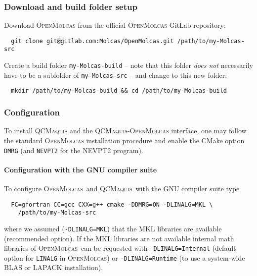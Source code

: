 \documentclass[bibliography=totoc,12pt,a4paper]{scrartcl}
\newcommand{\mol}{\textsc{OpenMolcas}}
\newcommand{\qcm}{\textsc{QCMaquis}}
\newcommand{\molbuild}{\texttt{my-Molcas-build}}
\newcommand{\kwd}[1]{\texttt{#1}}
\begin{document}
\subsubsection{Download and build folder setup}

Download \mol{} from the official \mol{} GitLab repository:

\begin{verbatim}
  git clone git@gitlab.com:Molcas/OpenMolcas.git /path/to/my-Molcas-src
\end{verbatim}

\noindent Create a build folder \texttt{\molbuild} -- note that this folder \emph{does not} necessarily have to be a subfolder
of \texttt{my-Molcas-src} -- and change to this new folder:

\begin{verbatim}
  mkdir /path/to/my-Molcas-build && cd /path/to/my-Molcas-build
\end{verbatim}

\subsubsection{Configuration}
\label{subsubsec:configure}

To install \qcm{} and the \qcm{}-\mol{} interface, one may follow the standard \mol{} installation procedure and enable the CMake option \kwd{DMRG} (and \kwd{NEVPT2} for the NEVPT2 program).


\paragraph{Configuration with the GNU compiler suite}
\label{sec:gnu-conf}$\;$\\

\noindent To configure \mol\ and \qcm\ with the GNU compiler suite type

\begin{verbatim}
  FC=gfortran CC=gcc CXX=g++ cmake -DDMRG=ON -DLINALG=MKL \
    /path/to/my-Molcas-src
\end{verbatim}

\noindent where we assumed (\texttt{-DLINALG=MKL}) that the MKL libraries are available (recommended option).
If the MKL libraries are not available internal math libraries of \mol\ can be requested with \texttt{-DLINALG=Internal} (default option for \texttt{LINALG} in \mol) or \texttt{-DLINALG=Runtime} (to use a system-wide BLAS or LAPACK installation). %
\end{document}
